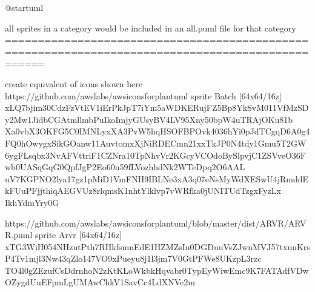 \documentclass[letterpaper,10pt,english]{sphinxmanual}
\begin{document}
\begin{figure}[htbp]
\centering
\capstart

\caption{}\label{\detokenize{Stdlib/StandardisingStdLib:id4}}\end{figure}

\begin{sphinxVerbatim}[commandchars=\\\{\},numbers=left,firstnumber=1,stepnumber=1]
@startuml

\PYGZsq{}all sprites in a category would be included in an all.puml file for that category
\PYGZsq{}==================================================================================================

\PYGZsq{}create equivalent of icons shown here https://github.com/awslabs/aws\PYGZhy{}icons\PYGZhy{}for\PYGZhy{}plantuml
sprite \PYGZdl{}Batch [64x64/16z] \PYGZob{}
xLQ7bjim30CdzFzVtEV1iErPkJpT7iYm5aWDKERujFZ5Bp8YkSvM011VfMzSDy2Mw1JidbCGAtmllmbPuIkoImjyGUsyBV4LV95\PYGZus{}Xny50bpW4uTRAjOKu81b
Xa0vbX3OKFG5C0IMNLyxXA\PYGZus{}3PvW5hqHSOFBP\PYGZus{}Ovk4036hYi0pJdTCgqD6A0g4FQ0hOwygxSikGOanw11AuvtomxXjNiRDECmn21xxTkJP0N4tdy1Gmu5T2GW
6ygFL\PYGZus{}sqbx3NvA\PYGZus{}FVtt\PYGZus{}ri\PYGZus{}F1CZNra\PYGZhy{}10TpNhvVr2KGcyVCOdoBySlpv\PYGZhy{}jC1ZSVveO36\PYGZus{}Fwb0UASqGqG0QpfJgP2Eo60u59\PYGZhy{}fLVozhhdNk2WTeDpq2O6AAL\PYGZus{}
uV7KGPNO2lya17gz1pMiD1VmFNH9IBLNe3xA3q07eNsMy\PYGZus{}WdXESwU4jRmddEk\PYGZhy{}FUuPFjjthiqAEGVUz8rlqmsK1nhtYlklvp7vWRfka0jUNITUdTzgxFyzLx
\PYGZhy{}Ikh\PYGZus{}YdmYr\PYGZus{}y0G
\PYGZcb{}

\PYGZsq{}https://github.com/awslabs/aws\PYGZhy{}icons\PYGZhy{}for\PYGZhy{}plantuml/blob/master/dist/ARVR/ARVR.puml
sprite \PYGZdl{}Arvr [64x64/16z] \PYGZob{}
xTG3WiH054NHzutP\PYGZus{}th7RHkfsmnEdE1HZMZsIn0\PYGZus{}DGDuuVsZJwnMVJ\PYGZhy{}57txuuKrsP4Tv1mjl3Nw43qZlo147VO9xPueyu8j1l3jm7V0GtPFWe8\PYGZus{}UKzpL3rzc
TO4l0gZEzufCsDd\PYGZhy{}rnhoN2zKtKLoWk\PYGZhy{}bkHq\PYGZhy{}\PYGZhy{}vabr0TypEy\PYGZus{}WiwEmc9K7FATAd\PYGZus{}fVDwOZygdU\PYGZus{}uEF\PYGZus{}pmLgUMA\PYGZus{}wChkV1SavCc4LdXNVe2m
\PYGZcb{}


\end{sphinxVerbatim}
\end{document}
